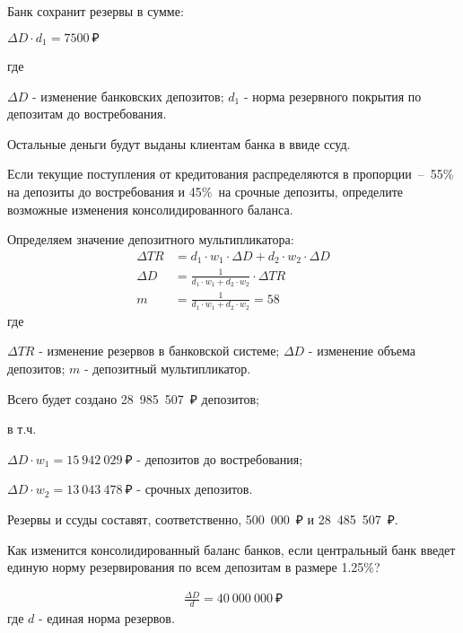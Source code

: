 \documentclass[12pt, table]{exam}
\begin{document}
\begin{questions}
\begin{subparts}
	\begin{solution}[12em]
		Банк сохранит резервы в сумме:
		
		$\Delta D \cdot d_1 = 7500~₽$
		
		где 
		
		$\Delta D$ - изменение банковских депозитов; $d_1$ - норма резервного покрытия по депозитам до востребования.
		
		Остальные деньги будут выданы клиентам банка в ввиде ссуд.
		
	\end{solution}
	
	\subpart[10]  Если текущие поступления от кредитования распределяются в пропорции – 55\% на депозиты до востребования и 45\% на срочные депозиты, определите возможные изменения консолидированного баланса.
	
	\begin{solution}[12em]
		Определяем значение депозитного мультипликатора:
		\begin{align*}
		\Delta TR&= d_1 \cdot w_1 \cdot \Delta D + d_2 \cdot w_2 \cdot \Delta D\\
		\Delta D&=\frac{1}{d_1 \cdot w_1 +d_2 \cdot w_2}\cdot \Delta TR\\
		m&= \frac{1}{d_1 \cdot w_1 +d_2 \cdot w_2} = 58
		\end{align*}
		где
		
		$\Delta TR$ - изменение резервов в банковской системе; $\Delta D$ - изменение объема депозитов; $m$ - депозитный мультипликатор.
		
		Всего будет создано 28~985~507~₽ депозитов;
		
		в т.ч.
		
		$\Delta D \cdot w_1= 15~942~029~₽$ - депозитов до востребования;
		
		$\Delta D \cdot w_2= 13~043~478~₽$ - срочных депозитов.
		
		Резервы и ссуды составят, соответственно, 500~000~₽ и 28~485~507~₽.
		
		
	\end{solution}
	
	\subpart[3] Как изменится консолидированный баланс банков, если центральный банк введет единую норму резервирования по всем депозитам в размере 1.25\%?
	\begin{solution}[12em]
		\begin{align*}
		\frac{\Delta D }{d}=40~000~000~₽
		\end{align*}
		где $d$ - единая норма резервов.
		

\end{solution}
\end{subparts}
\end{questions}
\end{document}
